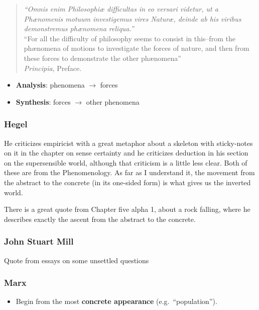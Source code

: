 \begin{quote}
\footnotesize
\emph{``Omnis enim Philosophiæ difficultas in eo versari videtur, ut a Phænomenis motuum investigemus vires Naturæ, deinde ab his viribus demonstremus phænomena reliqua.''}
\\[0.6ex]
``For all the difficulty of philosophy seems to consist in this--from the phænomena of motions to investigate the forces of nature, and then from these forces to demonstrate the other phænomena''
\\
\hfill{\scriptsize  \textit{Principia}, Preface.}
\end{quote}

\begin{itemize}
  \item \textbf{Analysis}: phenomena $\rightarrow$ forces %
  \item \textbf{Synthesis}: forces $\rightarrow$ other phenomena %
\end{itemize}


\subsubsection{Hegel}
He criticizes empiricist with a great metaphor about a skeleton with sticky-notes on it in the chapter on sense certainty and he criticizes deduction in his section on the supersensible  world, although that criticism is a little less clear. Both of these are from the Phenomenology. 
As far as I understand it, the movement from the abstract to the concrete (in its one-sided form) is what gives us the inverted world. 

There is a great quote from Chapter five alpha 1, about a rock falling, where he describes exactly the ascent from the abstract to the concrete. 

\subsubsection{John Stuart Mill}
Quote from essays on some unsettled questions

\subsubsection{Marx}


      \begin{itemize}
        \item Begin from the most \textbf{concrete appearance} (e.g.\ ``population'').
      \end{itemize}



